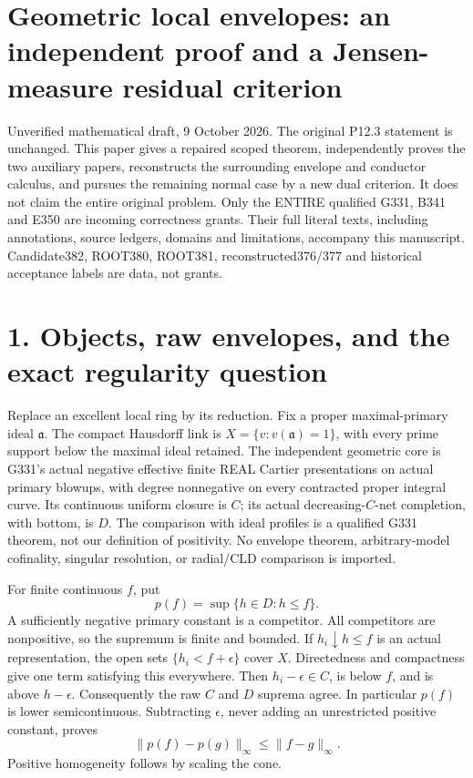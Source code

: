 \documentclass[11pt]{article}
\begin{document}
\section{Geometric local envelopes: an independent proof and a Jensen-measure residual criterion}

Unverified mathematical draft, 9 October 2026. The original P12.3 statement is unchanged. This paper gives a repaired scoped theorem, independently proves the two auxiliary papers, reconstructs the surrounding envelope and conductor calculus, and pursues the remaining normal case by a new dual criterion. It does not claim the entire original problem. Only the ENTIRE qualified G331, B341 and E350 are incoming correctness grants. Their full literal texts, including annotations, source ledgers, domains and limitations, accompany this manuscript. Candidate382, ROOT380, ROOT381, reconstructed376/377 and historical acceptance labels are data, not grants.

\section{1. Objects, raw envelopes, and the exact regularity question}

Replace an excellent local ring by its reduction. Fix a proper maximal-primary ideal \(\mathfrak a\). The compact Hausdorff link is \(X=\{v:v(\mathfrak a)=1\}\), with every prime support below the maximal ideal retained. The independent geometric core is G331's actual negative effective finite REAL Cartier presentations on actual primary blowups, with degree nonnegative on every contracted proper integral curve. Its continuous uniform closure is \(C\); its actual decreasing-\(C\)-net completion, with bottom, is \(D\). The comparison with ideal profiles is a qualified G331 theorem, not our definition of positivity. No envelope theorem, arbitrary-model cofinality, singular resolution, or radial/CLD comparison is imported.

For finite continuous \(f\), put
\[
p(f)=\sup\{h\in D:h\le f\}.
\]
A sufficiently negative primary constant is a competitor. All competitors are nonpositive, so the supremum is finite and bounded. If \(h_i\downarrow h\le f\) is an actual representation, the open sets \(\{h_i<f+\epsilon\}\) cover \(X\). Directedness and compactness give one term satisfying this everywhere. Then \(h_i-\epsilon\in C\), is below \(f\), and is above \(h-\epsilon\). Consequently the raw \(C\) and \(D\) suprema agree. In particular \(p(f)\) is lower semicontinuous. Subtracting \(\epsilon\), never adding an unrestricted positive constant, proves
\[
\|p(f)-p(g)\|_\infty\le\|f-g\|_\infty.
\]
Positive homogeneity follows by scaling the cone.
\end{document}
